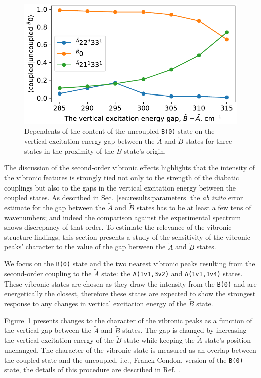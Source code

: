 \documentclass{article}
\begin{document}
\begin{figure}
    \begin{center}
        \includegraphics[width=12 cm]{./figures/decomposition.pdf}
    \end{center}
    \caption{
        Dependents of the content of the uncoupled \texttt{B(0)} state on the
        vertical excitation energy gap between the $\tilde{A}$ and $\tilde{B}$
        states for three states in the proximity of the $\tilde{B}$ state's
        origin.
    }
    \label{fig:decomposition}
\end{figure}


The discussion of the second-order vibronic effects highlights that the
intensity of the vibronic features is strongly tied not only to the strength of
the diabatic couplings but also to the gaps in the vertical excitation energy
between the coupled states. As described in Sec.~\ref{sec:results:parameters}
the \emph{ab inito} error estimate for the gap between the $\tilde{A}$ and
$\tilde{B}$ states has to be at least a few tens of wavenumbers; and indeed the
comparison against the experimental spectrum shows discrepancy of that order.
To estimate the relevance of the vibronic structure findings, this section
presents a study of the sensitivity of the vibronic peaks' character to the
value of the gap between the $\tilde{A}$ and $\tilde{B}$ states.

We focus on the \texttt{B(0)} state and the two nearest vibronic peaks
resulting from the second-order coupling to the $\tilde{A}$ state: the
\texttt{A(1v1,3v2)} and \texttt{A(1v1,1v4)} states. These vibronic states are
chosen as they draw the intensity from the \texttt{B(0)} and are energetically
the closest, therefore these states are expected to show the strongest response
to any changes in vertical excitation energy of the $\tilde{B}$ state.

Figure~\ref{fig:decomposition} presents changes to the character of the
vibronic peaks as a function of the vertical gap between the $\tilde{A}$ and
$\tilde{B}$ states. The gap is changed by increasing the vertical excitation
energy of the $\tilde{B}$ state while keeping the $\tilde{A}$ state's position
unchanged. The character of the vibronic state is measured as an overlap
between the coupled state and the uncoupled, i.e., Franck-Condon, version of
the \texttt{B(0)} state, the details of this procedure are described in
Ref.~\cite{Wojcik:ozone:2024}.
\end{document}
